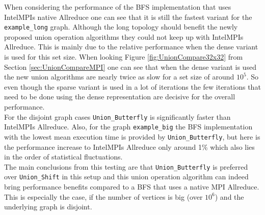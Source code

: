 When considering the performance of the BFS implementation that uses IntelMPIs native Allreduce one can see that it is still the fastest variant for the \texttt{example\_long} graph. 
Although the long topology should benefit the newly proposed union operation algorithms they could not keep up with IntelMPIs Allreduce. This is mainly due to the relative performance when the dense variant is used for this set size. When looking Figure \ref{fig:UnionCompare32x32} from Section \ref{sec:UnionCompareMPI} one can see that when the dense variant is used the new union algorithms are nearly twice as slow for a set size of around $10^5$. So even though the sparse variant is used in a lot of iterations the few iterations that need to be done using the dense representation are decisive for the overall performance.\\
For the disjoint graph cases \texttt{Union\_Butterfly} is significantly faster than IntelMPIs Allreduce. Also, for the graph \texttt{example\_big} the BFS implementation with the lowest mean execution time is provided by \texttt{Union\_Butterfly}, but here is the performance increase to IntelMPIs Allreduce only around 1\% which also lies in the order of statistical fluctuations.\\
The main conclusions from this testing are that \texttt{Union\_Butterfly} is preferred over \texttt{Union\_Shift} in this setup and this union operation algorithm can indeed bring performance benefits compared to a BFS that uses a native MPI Allreduce. This is especially the case, if the number of vertices is big (over $10^6$) and the underlying graph is disjoint.


